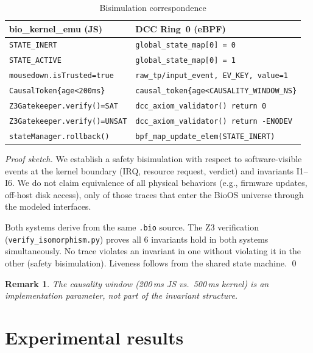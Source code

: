 \documentclass[11pt,a4paper,twoside]{article}
\newtheorem*{remark}{Remark}
\begin{document}
\begin{table}[H]
\centering
\caption{Bisimulation correspondence\label{tab:bisim}}
\begin{tabular}{@{}ll@{}}
\toprule
\textbf{bio\_kernel\_emu (JS)} & \textbf{DCC Ring~0 (eBPF)} \\ \midrule
\texttt{STATE\_INERT}               & \texttt{global\_state\_map[0] = 0} \\
\texttt{STATE\_ACTIVE}              & \texttt{global\_state\_map[0] = 1} \\
\texttt{mousedown.isTrusted=true}   & \texttt{raw\_tp/input\_event, EV\_KEY, value=1} \\
\texttt{CausalToken\{age<200ms\}}   & \texttt{causal\_token\{age<CAUSALITY\_WINDOW\_NS\}} \\
\texttt{Z3Gatekeeper.verify()=SAT}  & \texttt{dcc\_axiom\_validator() return 0} \\
\texttt{Z3Gatekeeper.verify()=UNSAT}& \texttt{dcc\_axiom\_validator() return -ENODEV} \\
\texttt{stateManager.rollback()}    & \texttt{bpf\_map\_update\_elem(STATE\_INERT)} \\
\bottomrule
\end{tabular}
\end{table}

\begin{proof}[Proof sketch]
We establish a safety bisimulation with respect to software-visible events at the
kernel boundary (IRQ, resource request, verdict) and invariants I1--I6. We do not
claim equivalence of all physical behaviors (e.g., firmware updates, off-host disk
access), only of those traces that enter the BioOS universe through the modeled
interfaces.

Both systems derive from the same \texttt{.bio} source. The Z3 verification
(\texttt{verify\_isomorphism.py}) proves all 6 invariants hold in both systems
simultaneously. No trace violates an invariant in one without violating it in the
other (safety bisimulation). Liveness follows from the shared state machine. \qed
\end{proof}

\begin{remark}
The causality window (200\,ms JS vs.\ 500\,ms kernel) is an implementation
parameter, not part of the invariant structure.
\end{remark}

\section{Experimental results}
\end{document}
